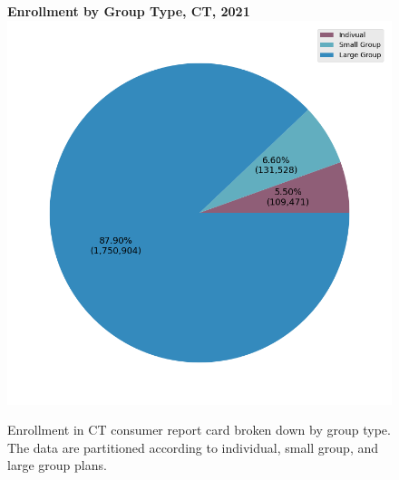 \documentclass[12pt, a4paper,twoside]{report}
\theoremstyle{plain} %
\theoremstyle{definition} %
\theoremstyle{remark} %
\numberwithin{equation}{chapter}
\begin{document}
		\begin{figure}[h!]
			\centering
			\textbf{Enrollment by Group Type, CT, 2021}
			\includegraphics[width=\columnwidth]{images/ct_claims/enrollment_by_group_type.png}
			\caption{Enrollment in CT consumer report card broken down by group type. The data are partitioned according to individual, small group, and large group plans.}
			\label{ctenrollmentbygrouptype}
		\end{figure}
\end{document}
